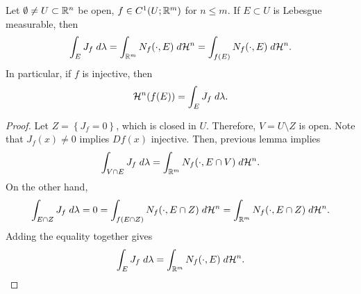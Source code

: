 \documentclass[a4paper]{article}
\begin{document}
\begin{thm}
Let $\emptyset \neq U \subset \mathbb{R}^n$ be open, $f \in C^1(U; 
\mathbb{R}^m)$ for $n \leq m$. If $E \subset U$ is Lebesgue measurable, 
then 
\[
\int_E J_f \; d \lambda = \int_{\mathbb{R}^m} N_f(\cdot, E) \; d \mathcal{H}^n
= \int_{f(E)} N_f(\cdot, E) \; d \mathcal{H}^n.
\]
In particular, if $f$ is injective, then 
\[
\mathcal{H}^n (f(E)) = \int_E J_f \; d \lambda.
\]
\end{thm}

\begin{proof}
Let $Z = \left\{ J_f = 0 \right\}$, which is closed in $U$. 
Therefore, $V = U \setminus Z$ is open. 
Note that $J_f(x) \neq 0$ implies $Df(x)$ injective.
Then, previous lemma implies 
\[
\int_{V \cap E} J_f \; d \lambda 
= \int_{\mathbb{R}^m} N_f(\cdot, E \cap V) \; d \mathcal{H}^n.
\]
On the other hand, 
\[
\int_{E \cap Z} J_f \; d \lambda = 0 
= \int_{f(E \cap Z)} N_f (\cdot, E \cap Z) \; d \mathcal{H}^n
= \int_{\mathbb{R}^m} N_f(\cdot, E \cap Z) \; d \mathcal{H}^n.
\]
Adding the equality together gives 
\[
\int_E J_f \; d \lambda = \int_{\mathbb{R}^m} N_f(\cdot, E) \; d \mathcal{H}^n.
\]
\end{proof}
\end{document}
